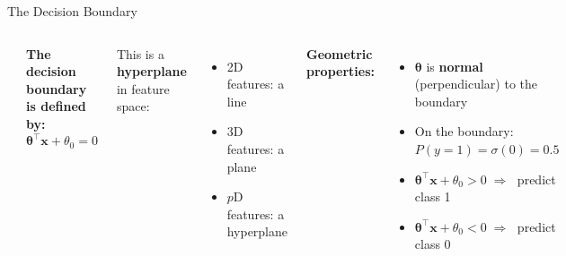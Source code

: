 \documentclass[aspectratio=169,11pt]{beamer}
\begin{document}
\begin{frame}{The Decision Boundary}
\begin{columns}[T]
\begin{center}
\end{center}

\textbf{The decision boundary is defined by:}
\[
  \boldsymbol{\theta}^\top\boldsymbol{x}+\theta_0=0
\]

This is a \textbf{hyperplane} in feature space:
\begin{itemize}
  \item 2D features: a line
  \item 3D features: a plane
  \item $p$D features: a hyperplane
\end{itemize}

\vspace{0.3em}
\textbf{Geometric properties:}
\begin{itemize}
  \item $\boldsymbol{\theta}$ is \textbf{normal} (perpendicular) to the boundary
  \item On the boundary: $P(y{=}1)=\sigma(0)=0.5$
  \item $\boldsymbol{\theta}^\top\boldsymbol{x}+\theta_0 > 0 \;\Rightarrow\;$ predict class 1
  \item $\boldsymbol{\theta}^\top\boldsymbol{x}+\theta_0 < 0 \;\Rightarrow\;$ predict class 0
\end{itemize}
\end{columns}
\end{frame}
\end{document}
